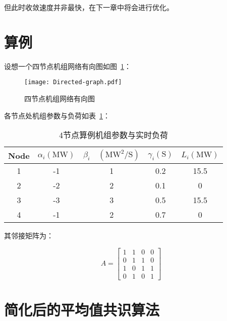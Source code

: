 但此时收敛速度并非最快，在下一章中将会进行优化。


\section{算例}

设想一个四节点机组网络有向图如图~\ref{fig:Directed-graph}：


\begin{figure}[htbp] %
    \centering
    \texttt{[image: Directed-graph.pdf]}
    \caption{四节点机组网络有向图}
    \label{fig:Directed-graph}
\end{figure}

各节点处机组参数与负荷如表~\ref{tab:example}：

\begin{table}[htbp]
    \centering
    \begin{tabular}{@{}ccccc@{}}
    \toprule
    \multicolumn{1}{c}{Node} & $\alpha_{i}(\mathrm{MW})$  & $\beta_{i} \quad\left(\mathrm{MW}^{2} / \mathrm{S}\right)$ & $\gamma_{i}(\mathrm{S})$   & $L_{i}(\mathrm{MW})$    \\ \midrule
    1                        & -1 & 1 & 0.2 & 15.5 \\
    2                        & -2 & 2 & 0.1 & 0    \\
    3                        & -3 & 3 & 0.5 & 15.5 \\
    4                        & -1 & 2 & 0.7 & 0    \\ \bottomrule
    \end{tabular}
    \caption{4节点算例机组参数与实时负荷}
    \label{tab:example}
\end{table}

其邻接矩阵为：

\begin{equation}
    A=\left[\begin{array}{cccc}
    {1} & {1} & {0} & {0} \\
    {0} & {1} & {1} & {0} \\
    {1} & {0} & {1} & {1} \\
    {0} & {1} & {0} & {1}
    \end{array}\right]
\end{equation}


\section{简化后的平均值共识算法}

